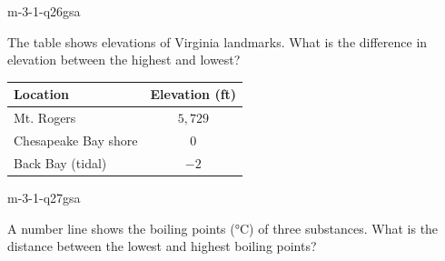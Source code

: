 \begin{practiceQuestion}{m-3-1-q26}{gsa}
\begin{questionText}
The table shows elevations of Virginia landmarks. What is the difference in elevation between the highest and lowest?

\begin{center}
\begin{tabular}{|l|c|}
\hline
\textbf{Location} & \textbf{Elevation (ft)} \\
\hline
Mt. Rogers & $5{,}729$ \\ \hline
Chesapeake Bay shore & $0$ \\ \hline
Back Bay (tidal) & $-2$ \\ \hline
\end{tabular}
\end{center}
\end{questionText}
\end{practiceQuestion}

\begin{practiceQuestion}{m-3-1-q27}{gsa}
\begin{questionText}
A number line shows the boiling points (°C) of three substances. What is the distance between the lowest and highest boiling points?

\begin{center}
\end{center}
\end{questionText}
\end{practiceQuestion}
